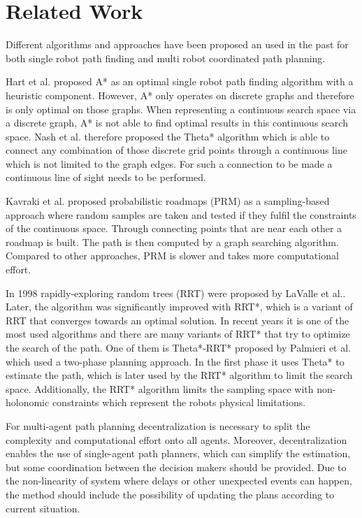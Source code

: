 \documentclass[journal]{IEEEtran}
\begin{document}
\section{Related Work}
\label{sec:related_work}
Different algorithms and approaches have been proposed an used in the past for both single robot path finding and multi robot coordinated path planning. 

Hart et al.\cite{AStar} proposed A* as an optimal single robot path finding algorithm with a heuristic component. However, A* only operates on discrete graphs and therefore is only optimal on those graphs. When representing a continuous search space via a discrete graph, A* is not able to find optimal results in this continuous search space. Nash et al.\cite{ThetaStar} therefore proposed the Theta* algorithm which is able to connect any combination of those discrete grid points through a continuous line which is not limited to the graph edges. For such a connection to be made a continuous line of sight needs to be performed.

Kavraki et al. \cite{Roadmaps} proposed probabilistic roadmaps (PRM) as a sampling-based approach where random samples are taken and tested if they fulfil the constraints of the continuous space. Through connecting points that are near each other a roadmap is built. The path is then computed by a graph searching algorithm. Compared to other approaches, PRM is slower and takes more computational effort.

In 1998 rapidly-exploring random trees (RRT) were proposed by LaValle et al.\cite{RRT}. Later, the algorithm was significantly improved with RRT*\cite{RRTStar}, which is a variant of RRT that converges towards an optimal solution. In recent years it is one of the most used algorithms and there are many variants of RRT* that try to optimize the search of the path. One of them is Theta*-RRT* proposed by Palmieri et al.\cite{ThetaStarRRTStar} which used a two-phase planning approach. In the first phase it uses Theta* to estimate the path, which is later used by the RRT* algorithm to limit the search space. Additionally, the RRT* algorithm limits the sampling space with non-holonomic constraints which represent the robots physical limitations.

For multi-agent path planning decentralization is necessary to split the complexity and computational effort onto all agents. Moreover, decentralization enables the use of single-agent path planners, which can simplify the estimation, but some coordination between the decision makers should be provided. Due to the non-linearity of system where delays or other unexpected events can happen, the method should include the possibility of updating the plans according to current situation.
\end{document}

